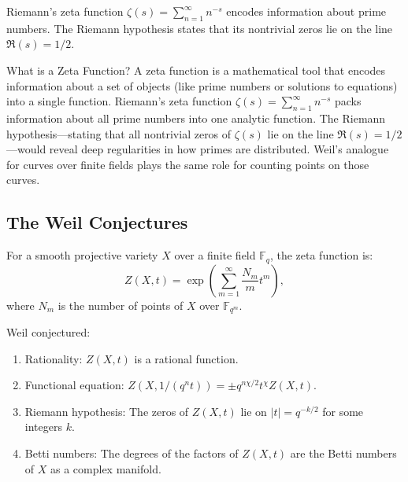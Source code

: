 Riemann's zeta function $\zeta(s) = \sum_{n=1}^\infty n^{-s}$ encodes information about prime numbers. The Riemann hypothesis states that its nontrivial zeros lie on the line $\Re(s) = 1/2$.

\begin{primer}{What is a Zeta Function?}
A zeta function is a mathematical tool that encodes information about a set of objects (like prime numbers or solutions to equations) into a single function. Riemann's zeta function $\zeta(s) = \sum_{n=1}^\infty n^{-s}$ packs information about all prime numbers into one analytic function. The Riemann hypothesis---stating that all nontrivial zeros of $\zeta(s)$ lie on the line $\Re(s)=1/2$---would reveal deep regularities in how primes are distributed. Weil's analogue for curves over finite fields plays the same role for counting points on those curves.
\end{primer}

\subsection{The Weil Conjectures}

For a smooth projective variety $X$ over a finite field $\mathbb{F}_q$, the zeta function is:
\[
Z(X, t) = \exp\left(\sum_{m=1}^\infty \frac{N_m}{m} t^m\right),
\]
where $N_m$ is the number of points of $X$ over $\mathbb{F}_{q^m}$.

Weil conjectured:
\begin{enumerate}
\item Rationality: $Z(X, t)$ is a rational function.
\item Functional equation: $Z(X, 1/(q^n t)) = \pm q^{n\chi/2} t^\chi Z(X, t)$.
\item Riemann hypothesis: The zeros of $Z(X, t)$ lie on $|t| = q^{-k/2}$ for some integers $k$.
\item Betti numbers: The degrees of the factors of $Z(X, t)$ are the Betti numbers of $X$ as a complex manifold.
\end{enumerate}

